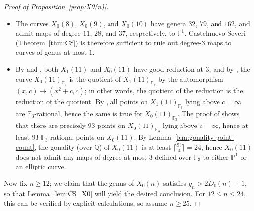 \documentclass[12pt]{amsart}
\theoremstyle{definition}
\newcommand{\bbF}{\mathbb{F}}
\newcommand{\bbP}{\mathbb{P}}
\newcommand{\bbQ}{\mathbb{Q}}
\numberwithin{equation}{section}
\begin{document}
\begin{proof}[Proof of Proposition~\ref{prop:X0(n)}]
\begin{itemize}
        Finally, the Jacobian over $\mathbb{F}_3$ is simple, as the numerator of the zeta function is irreducible over $\mathbb{Q}$. Therefore, $X_0(7)$ does not admit any maps to elliptic curves.
        \item The curves $X_0(8)$, $X_0(9)$, and $X_0(10)$ have genera $32$, $79$, and $162$, and admit maps of degree $11$, $28$, and $37$, respectively, to $\mathbb{P}^1$. Castelnuovo-Severi (Theorem~\ref{thm:CS}) is therefore sufficient to rule out degree-$3$ maps to curves of genus at most $1$.
        \item By \cite[Theorem D]{doyle/etal:2019} and \cite[Theorem 10.1]{doyle/etal:2019}, both $X_1(11)$ and $X_0(11)$ have good reduction at $3$, and by \cite[Remark 3.12]{doyle/etal:2019}, the curve $X_0(11)_{\bbF_3}$ is the quotient of $X_1(11)_{\bbF_3}$ by the automorphism $(x,c) \mapsto (x^2 + c,c)$; in other words, the quotient of the reduction is the reduction of the quotient.
        By \cite[Proposition 10]{morton:1996}, all points on $X_1(11)_{\bbF_3}$ lying above $c = \infty$ are $\bbF_3$-rational, hence the same is true for $X_0(11)_{\bbF_3}$. The proof of \cite[Theorem 13(a)]{morton:1996} shows that there are precisely $93$ points on $X_0(11)_{\bbF_3}$ lying above $c = \infty$, hence at least $93$ $\bbF_3$-rational points on $X_0(11)$. By Lemma~\ref{lem:gonality-point-count}, the gonality (over $\bbQ$) of $X_0(11)$ is at least $\lceil \frac{93}{4}\rceil = 24$, hence $X_0(11)$ does not admit any maps of degree at most $3$ defined over $\bbF_3$ to either $\bbP^1$ or an elliptic curve.
    \end{itemize}

Now fix $n \ge 12$; we claim that the genus of $X_0(n)$ satisfies $g_n > 2D_0(n) + 1$, so that Lemma~\ref{lem:CS_X0} will yield the desired conclusion. For $12 \le n \le 24$, this can be verified by explicit calculations, so assume $n \ge 25$.


\end{proof}
\end{document}
